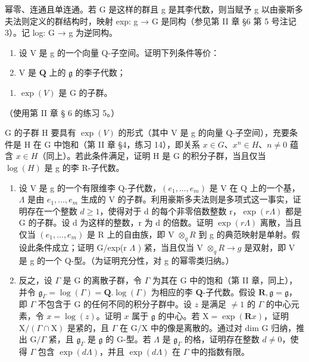 幂零、连通且单连通。若 G 是这样的群且 g 是其李代数，则当赋予 g 以由豪斯多夫法则定义的群结构时，映射 exp: g → G 是同构（参见第 II 章 §6 第 5 号注记 3）。记 log: G → g 为逆同构。

\begin{enumerate}
\def\labelenumi{(\alph{enumi})}
\item
  设 V 是 g 的一个向量 Q-子空间。证明下列条件等价：
\item
  V 是 \(\mathbf{Q}\) 上的 \(\mathfrak{g}\) 的李子代数；
\end{enumerate}

\begin{enumerate}
\def\labelenumi{(\roman{enumi})}
\setcounter{enumi}{1}
\tightlist
\item
  \(\exp(V)\) 是 G 的子群。
\end{enumerate}

（使用第 II 章 § 6 的练习 5。）

G 的子群 H 要具有 \(\exp(V)\) 的形式（其中 V 是 g 的向量 Q-子空间），充要条件是 H 在 G 中饱和（第 II 章 §4，练习 14），即关系 \(x \in G\)、\(x^{n} \in H\)、\(n \neq 0\) 蕴含 \(x \in H\)（同上）。若此条件满足，证明 H 是 G 的积分子群，当且仅当 \(\log(H)\) 是 g 的李 R-子代数。

\begin{enumerate}
\def\labelenumi{(\alph{enumi})}
\setcounter{enumi}{1}
\item
  设 V 是 g 的一个有限维李 Q-子代数，\((e_{1},\ldots,e_{m})\) 是 V 在 Q 上的一个基，\(\Lambda\) 是由 \(e_{1},\ldots,e_{m}\) 生成的 V 的子群。利用豪斯多夫法则是多项式这一事实，证明存在一个整数 \(d\geqslant1\)，使得对于 d 的每个非零倍数整数 r，\(\exp(r\Lambda)\) 都是 G 的子群。设 d 为这样的整数，r 为 d 的倍数。证明 \(\exp(r\Lambda)\) 离散，当且仅当 \((e_{1},\ldots,e_{m})\) 是 R 上的自由族，即 V \(\otimes_{q}R\) 到 g 的典范映射是单射。假设此条件成立；证明 G/exp(r \(\Lambda\) ) 紧，当且仅当 V \(\otimes_{q}R\to g\) 是双射，即 V 是 g 的一个 Q-型。（为证明充分性，对 g 的幂零类归纳。）
\item
  反之，设 \(\Gamma\) 是 G 的离散子群，令 \(\Gamma\) 为其在 G 中的饱和（第 II 章，同上），并令 \(\mathfrak{g}_{\Gamma} = \log (\Gamma) = \mathbf{Q}. \log (\Gamma)\) 为相应的李 \(\mathbf{Q}\)-子代数。假设 \(\mathbf{R}, \mathfrak{g} = \mathfrak{g}\)，即 \(\Gamma\) 不包含于 G 的任何不同的积分子群中。设 \(z\) 是满足 \(\neq 1\) 的 \(\Gamma\) 的中心元素，令 \(x = \log (z)\)。证明 \(x\) 属于 \(\mathfrak{g}\) 的中心。若 \(\mathrm{X} = \exp (\mathbf{R}x)\)，证明 \(\mathrm{X} / (\Gamma \cap \mathrm{X})\) 是紧的，且 \(\Gamma\) 在 \(\mathrm{G} / \mathrm{X}\) 中的像是离散的。通过对 dim G 归纳，推出 \(\mathrm{G} / \Gamma\) 紧，且 \(\mathfrak{g}_{\Gamma}\) 是 \(\mathfrak{g}\) 的 G-型。若 \(\Lambda\) 是 \(\mathfrak{g}_{\Gamma}\) 的格，证明存在整数 \(d \neq 0\)，使得 \(\Gamma\) 包含 \(\exp (d\Lambda)\)，并且 \(\exp (d\Lambda)\) 在 \(\Gamma\) 中的指数有限。
\end{enumerate}

